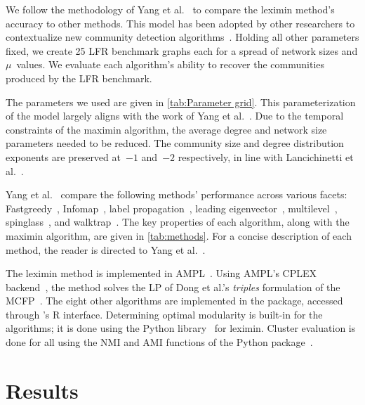 We follow the methodology of Yang et al.~\cite{yang2016comparative} to compare the leximin method's accuracy to other methods. This model has been adopted by other researchers to contextualize new community detection algorithms~\cite{pares2017fluid}. Holding all other parameters fixed, we create 25 LFR benchmark graphs each for a spread of network sizes and $\mu$~values. We evaluate each algorithm's ability to recover the communities produced by the LFR benchmark.

The parameters we used are given in \autoref{tab:Parameter grid}.
This parameterization of the model largely aligns with the work of Yang et al.~\cite{yang2016comparative}. Due to the temporal constraints of the maximin algorithm, the average degree and network size parameters needed to be reduced. The community size and degree distribution exponents are preserved at~$-1$ and~$-2$ respectively, in line with Lancichinetti et al.~\cite{lancichinetti2008benchmark}.

Yang et al.~\cite{yang2016comparative} compare the following methods' performance across various facets: Fastgreedy~\cite{clauset2004finding}, Infomap~\cite{rosvall2007information, rosvall2009map}, label propagation~\cite{raghavan2007near}, leading eigenvector~\cite{newman2006finding}, multilevel~\cite{blondel2008fast}, spinglass~\cite{reichardt2006statistical}, and walktrap~\cite{pons2005computing}. The key properties of each algorithm, along with the maximin algorithm, are given in \autoref{tab:methods}. For a concise description of each method, the reader is directed to Yang et al.~\cite{yang2016comparative}.

The leximin method is implemented in AMPL~\cite{fourer1989mathematical}. Using AMPL's CPLEX backend~\cite{cplex2009v12}, the method solves the LP of Dong et al.'s \emph{triples} formulation of the MCFP~\cite{dong2015compact}. The eight other algorithms are implemented in the  package, accessed through 's R interface. Determining optimal modularity is built-in for the  algorithms; it is done using the  Python library~\cite{hagberg2008exploring} for leximin. Cluster evaluation is done for all using the NMI and AMI functions of the  Python package~\cite{pedregosa2011scikit}.



\section{Results}

